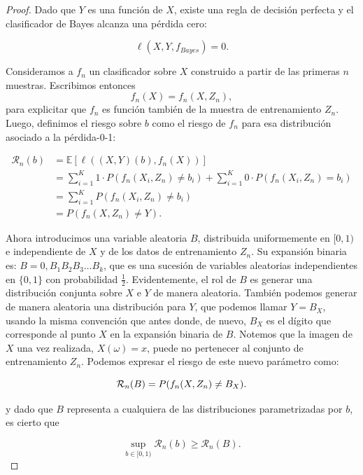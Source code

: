 \documentclass{report}
\begin{document}
\begin{proof}
Dado que \(Y\) es una función de \(X\), existe una regla de decisión perfecta y el clasificador de Bayes alcanza una pérdida cero:

\[
\ell(X,Y,f_{Bayes}) = 0.
\]

Consideramos a $f_n$ un clasificador sobre $X$ construido a partir de las primeras $n$ muestras. Escribimos entonces
\[
f_n(X) = f_n(X, Z_n),
\]
para explicitar que $f_n$ es función también de la muestra de entrenamiento $Z_n$. Luego, definimos el riesgo sobre \(b\)
como el riesgo de $f_n$ para esa distribución asociado a la pérdida-0-1:


\begin{equation*}
    \begin{aligned}
        \mathcal{R}_n(b) &= \mathbb{E}[\ell((X,Y)(b),f_n(X))]\\ 
        &= \sum_{i=1}^{K} 1 \cdot P(f_n(X_i, Z_n) \neq b_{i}) + \sum_{i=1}^{K} 0 \cdot P(f_n(X_i, Z_n) = b_{i})\\
        &= \sum_{i=1}^{K} P(f_n(X_i, Z_n) \neq b_{i}) \\
        &= P(f_n(X, Z_n) \neq Y).
    \end{aligned}
\end{equation*}


Ahora introducimos una variable aleatoria \(B\), distribuida uniformemente en \([0,1)\) e independiente de \(X\) y 
de los datos de entrenamiento \(Z_n\). Su expansión binaria es: \(B = 0,B_1B_2B_3\dots B_k\), que es una sucesión 
de variables aleatorias independientes en \(\{0,1\}\) con probabilidad $\frac{1}{2}$. Evidentemente, el rol de $B$
es generar una distribución conjunta sobre $X$ e $Y$ de manera aleatoria. También podemos generar de manera aleatoria
una distribución para $Y$, que podemos llamar $Y=B_X$, usando la misma convención que antes donde, de nuevo,
$B_X$ es el dígito que corresponde al punto $X$ en la expansión binaria de $B$. Notemos que la imagen de $X$ una vez realizada, $X(\omega) = x$, 
puede no pertenecer al conjunto de entrenamiento $Z_n$. \newline
Podemos expresar el riesgo de este nuevo parámetro como:


\[
\mathcal{R}_n(B) = P(f_n(X, Z_n) \neq B_X).\newline
\]

y dado que $B$ representa a cualquiera de las distribuciones parametrizadas por $b$, es cierto que

\begin{equation}
    \sup_{b\in[0,1)} \mathcal{R}_n(b) \geq \mathcal{R}_n(B). \label{eq:cota_parametro_b_distribuciones}
\end{equation}




\end{proof}
\end{document}
